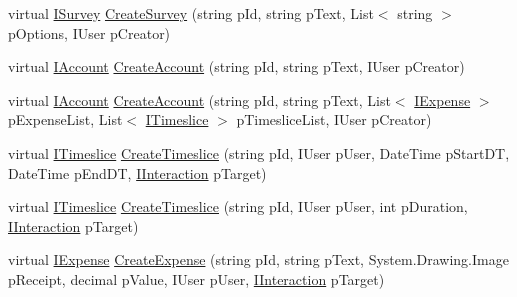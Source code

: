 \begin{DoxyCompactItemize}
\item 
virtual \hyperlink{interface_plex_byte_1_1_mo_cap_1_1_interactions_1_1_i_survey}{I\+Survey} \hyperlink{class_plex_byte_1_1_mo_cap_1_1_interactions_1_1_interaction_factory_a7cca7832aa0ee7ac17fa5f0339eeed2c}{Create\+Survey} (string p\+Id, string p\+Text, List$<$ string $>$ p\+Options, I\+User p\+Creator)
\item 
virtual \hyperlink{interface_plex_byte_1_1_mo_cap_1_1_interactions_1_1_i_account}{I\+Account} \hyperlink{class_plex_byte_1_1_mo_cap_1_1_interactions_1_1_interaction_factory_a08413bc140420733e410b17c2262e7ee}{Create\+Account} (string p\+Id, string p\+Text, I\+User p\+Creator)
\item 
virtual \hyperlink{interface_plex_byte_1_1_mo_cap_1_1_interactions_1_1_i_account}{I\+Account} \hyperlink{class_plex_byte_1_1_mo_cap_1_1_interactions_1_1_interaction_factory_a1d79c272ff2a70b71f7c8188756a0ae8}{Create\+Account} (string p\+Id, string p\+Text, List$<$ \hyperlink{interface_plex_byte_1_1_mo_cap_1_1_interactions_1_1_i_expense}{I\+Expense} $>$ p\+Expense\+List, List$<$ \hyperlink{interface_plex_byte_1_1_mo_cap_1_1_interactions_1_1_i_timeslice}{I\+Timeslice} $>$ p\+Timeslice\+List, I\+User p\+Creator)
\item 
virtual \hyperlink{interface_plex_byte_1_1_mo_cap_1_1_interactions_1_1_i_timeslice}{I\+Timeslice} \hyperlink{class_plex_byte_1_1_mo_cap_1_1_interactions_1_1_interaction_factory_a09b8c47419a3eefd5823056f72c47130}{Create\+Timeslice} (string p\+Id, I\+User p\+User, Date\+Time p\+Start\+DT, Date\+Time p\+End\+DT, \hyperlink{interface_plex_byte_1_1_mo_cap_1_1_interactions_1_1_i_interaction}{I\+Interaction} p\+Target)
\item 
virtual \hyperlink{interface_plex_byte_1_1_mo_cap_1_1_interactions_1_1_i_timeslice}{I\+Timeslice} \hyperlink{class_plex_byte_1_1_mo_cap_1_1_interactions_1_1_interaction_factory_a66108b416dc8f455fd0dc22123b2d143}{Create\+Timeslice} (string p\+Id, I\+User p\+User, int p\+Duration, \hyperlink{interface_plex_byte_1_1_mo_cap_1_1_interactions_1_1_i_interaction}{I\+Interaction} p\+Target)
\item 
virtual \hyperlink{interface_plex_byte_1_1_mo_cap_1_1_interactions_1_1_i_expense}{I\+Expense} \hyperlink{class_plex_byte_1_1_mo_cap_1_1_interactions_1_1_interaction_factory_a6d6a4839a754494e5db0adbb69fccc94}{Create\+Expense} (string p\+Id, string p\+Text, System.\+Drawing.\+Image p\+Receipt, decimal p\+Value, I\+User p\+User, \hyperlink{interface_plex_byte_1_1_mo_cap_1_1_interactions_1_1_i_interaction}{I\+Interaction} p\+Target)

\end{DoxyCompactItemize}
